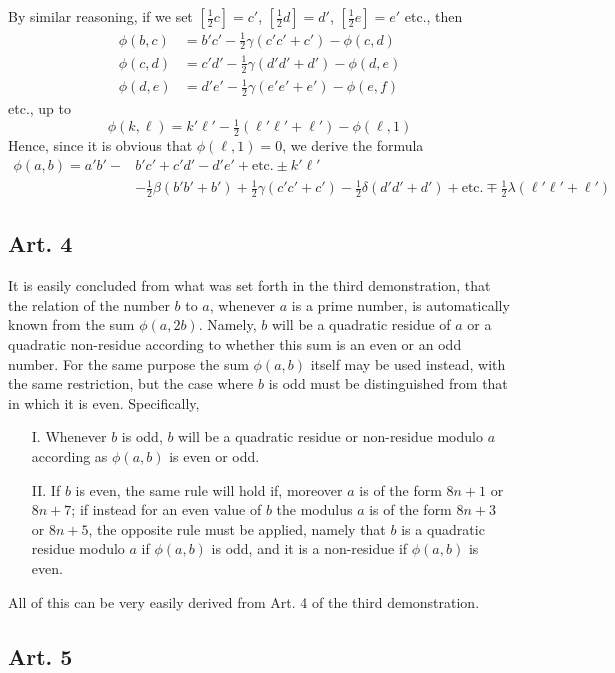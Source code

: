 \documentclass{book}
\theoremstyle{plain}
\theoremstyle{remark}
\begin{document}
By similar reasoning, if we set $[\tfrac{1}{2}c ] = c'$, $[\tfrac{1}{2}d] = d'$, $[\frac{1}{2} e] = e'$ etc., then
\begin{align*} 
\phi(b,c) &= b'c'-\tfrac{1}{2}\gamma(c'c'+c') - \phi(c,d)  \\
\phi(c,d) &= c'd'-\tfrac{1}{2}\gamma(d'd'+d') - \phi(d,e)  \\
\phi(d,e) &= d'e'-\tfrac{1}{2}\gamma(e'e'+e') - \phi(e,f)  
\end{align*}
etc., up to 
\[ \phi(k,\ell) = k'\ell'-\tfrac{1}{2}(\ell'\ell'+\ell') -\phi(\ell,1) \]
Hence, since it is obvious that $\phi(\ell, 1) = 0$, we derive the formula
\begin{align*} \phi(a,b) = a'b'-&b'c'+c'd'-d'e'+\textrm{etc.} \pm k'\ell' \\
&-\tfrac{1}{2}\beta(b'b'+b') + \tfrac{1}{2}\gamma(c'c'+c') - \tfrac{1}{2}\delta(d'd'+d') + \textrm{etc.} \mp \tfrac{1}{2} \lambda(\ell'\ell'+\ell') 
\end{align*}

\subsection*{Art. 4}

It is easily concluded from what was set forth in the third demonstration, that the relation of the number $b$ to $a$, whenever $a$ is a prime number, is automatically known from the sum $\phi(a,2b)$.  Namely, $b$ will be a quadratic residue of $a$ or a quadratic non-residue according to whether this sum is an even or an odd number.  For the same purpose the sum $\phi(a,b)$ itself may be used instead, with the same restriction, but the case where $b$ is odd must be distinguished from that in which it is even.  Specifically,
\begin{enumerate}
\item[I.] Whenever $b$ is odd, $b$ will be a quadratic residue or non-residue modulo $a$ according as $\phi(a,b)$ is even or odd.  
\item[II.] If $b$ is even, the same rule will hold if, moreover $a$ is of the form $8n+1$ or $8n+7$; if instead for an even value of $b$ the modulus $a$ is of the form $8n+3$ or $8n+5$, the opposite rule must be applied, namely that $b$ is a quadratic residue modulo $a$ if $\phi(a,b)$ is odd, and it is a non-residue if $\phi(a,b)$ is even.
\end{enumerate}
All of this can be very easily derived from Art. 4 of the third demonstration.

\subsection*{Art. 5} 
\end{document}
